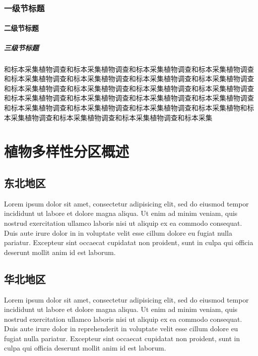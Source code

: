 \documentclass[utf8]{book}
\begin{document}
\section{一级节标题}

\subsection{二级节标题}

\subsubsection{三级节标题}

\begin{multicols}{2}
和标本采集植物调查和标本采集植物调查和标本采集植物调查和标本采集植物调查和标本采集植物调查和标本采集植物调查和标本采集植物调查和标本采集植物调查和标本采集植物调查和标本采集植物调查和标本采集植物调查和标本采集植物调查和标本采集植物调查和标本采集植物调查和标本采集植物调查和标本采集植物调查和标本采集植物调查和标本采集植物调查和标本采集植物调查和标本采集植物和标本采集植物调查和标本采集植物调查和标本采集植物调查和标本采集

\end{multicols}

\part{植物多样性分区概述}

\chapter{东北地区}

\begin{multicols}{2}
Lorem ipsum dolor sit amet, consectetur adipisicing elit, sed do eiusmod tempor incididunt ut labore et dolore magna aliqua. Ut enim ad minim veniam, quis nostrud exercitation ullamco laboris nisi ut aliquip ex ea commodo consequat. Duis aute irure dolor in  in voluptate velit esse cillum dolore eu fugiat nulla pariatur. Excepteur sint occaecat cupidatat non proident, sunt in culpa qui officia deserunt mollit anim id est laborum.
\end{multicols}

\chapter{华北地区}
\begin{multicols}{2}
Lorem ipsum dolor sit amet, consectetur adipisicing elit, sed do eiusmod tempor incididunt ut labore et dolore magna aliqua. Ut enim ad minim veniam, quis nostrud exercitation ullamco laboris nisi ut aliquip ex ea commodo consequat. Duis aute irure dolor in reprehenderit in voluptate velit esse cillum dolore eu fugiat nulla pariatur. Excepteur sint occaecat cupidatat non proident, sunt in culpa qui officia deserunt mollit anim id est laborum.
\end{multicols}
\end{document}
